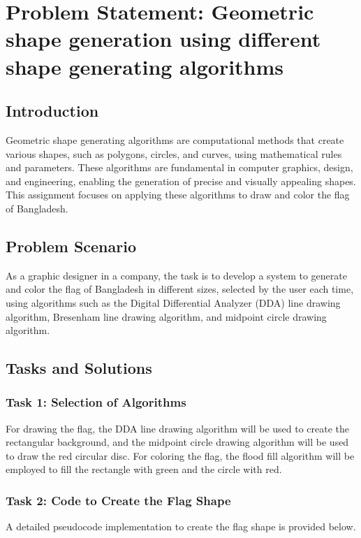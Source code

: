\documentclass[12pt]{article}
\begin{document}
\section*{Problem Statement: Geometric shape generation using different shape generating algorithms}

\subsection*{Introduction}
Geometric shape generating algorithms are computational methods that create various shapes, such as polygons, circles, and curves, using mathematical rules and parameters. These algorithms are fundamental in computer graphics, design, and engineering, enabling the generation of precise and visually appealing shapes. This assignment focuses on applying these algorithms to draw and color the flag of Bangladesh.

\subsection*{Problem Scenario}
As a graphic designer in a company, the task is to develop a system to generate and color the flag of Bangladesh in different sizes, selected by the user each time, using algorithms such as the Digital Differential Analyzer (DDA) line drawing algorithm, Bresenham line drawing algorithm, and midpoint circle drawing algorithm.

\subsection*{Tasks and Solutions}

\subsubsection*{Task 1: Selection of Algorithms}
For drawing the flag, the DDA line drawing algorithm will be used to create the rectangular background, and the midpoint circle drawing algorithm will be used to draw the red circular disc. For coloring the flag, the flood fill algorithm will be employed to fill the rectangle with green and the circle with red.

\subsubsection*{Task 2: Code to Create the Flag Shape}
A detailed pseudocode implementation to create the flag shape is provided below.
\end{document}
